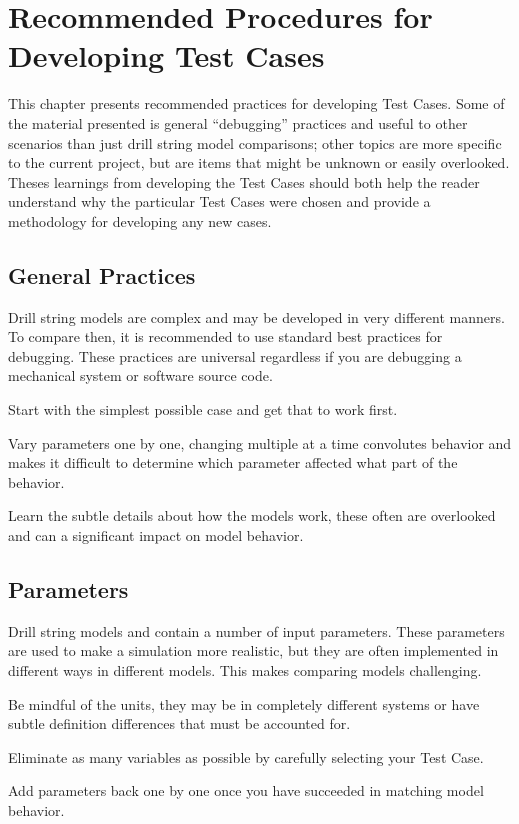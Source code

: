 \chapter{Recommended Procedures for Developing Test Cases}
\label{ch:testcaseprocedures}
This chapter presents recommended practices for developing Test Cases.  Some of the material presented is general ``debugging'' practices and useful to other scenarios than just drill string model comparisons; other topics are more specific to the current project, but are items that might be unknown or easily overlooked.  Theses learnings from developing the Test Cases should both help the reader understand why the particular Test Cases were chosen and provide a methodology for developing any new cases.

\section{General Practices}
Drill string models are complex and may be developed in very different manners.  To compare then, it is recommended to use standard best practices for debugging.  These practices are universal regardless if you are debugging a mechanical system or software source code.
\begin{bulletedlist}
	\item Start with the simplest possible case and get that to work first.
	\item Vary parameters one by one, changing multiple at a time convolutes behavior and makes it difficult to determine which parameter affected what part of the behavior.
    \item Learn the subtle details about how the models work, these often are overlooked and can a significant impact on model behavior.
\end{bulletedlist}

\section{Parameters}
Drill string models and contain a number of input parameters.  These parameters are used to make a simulation more realistic, but they are often implemented in different ways in different models.  This makes comparing models challenging.
\begin{bulletedlist}
	\item Be mindful of the units, they may be in completely different systems or have subtle definition differences that must be accounted for.
	\item Eliminate as many variables as possible by carefully selecting your Test Case.
	\item Add parameters back one by one once you have succeeded in matching model behavior.
\end{bulletedlist}

